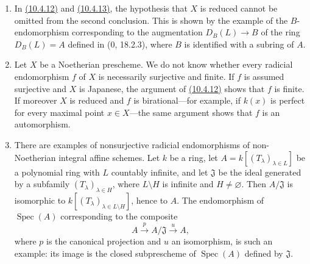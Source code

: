 \begin{remark}[10.4.14]
\label{IV.10.4.14}
\begin{enumerate}[label=\textup{(\roman*)}]
\item In {\hyperlink{ega4.c04.cor.10-4-12}{(10.4.12)}} and {\hyperlink{ega4.c04.cor.10-4-13}{(10.4.13)}}, the hypothesis that $X$ is reduced
cannot be omitted from the second conclusion.  This is shown by the
example of the $B$-endomorphism corresponding to the augmentation
$D_B(L)\to B$ of the ring $D_B(L)=A$ defined in (0, 18.2.3), where $B$
is identified with a subring of $A$.

\item Let $X$ be a Noetherian prescheme.  We do not know whether every
radicial endomorphism $f$ of $X$ is necessarily surjective and finite.
If $f$ is assumed surjective and $X$ is Japanese, the argument of
{\hyperlink{ega4.c04.cor.10-4-12}{(10.4.12)}} shows that $f$ is finite.  If moreover $X$ is reduced and
$f$ is birational---for example, if $k(x)$ is perfect for every maximal
point $x\in X$---the same argument shows that $f$ is an automorphism.

\item There are examples of nonsurjective radicial endomorphisms of
non-Noetherian integral affine schemes.  Let $k$ be a ring, let
$A=k[(T_\lambda)_{\lambda\in L}]$ be a polynomial ring with $L$
countably infinite, and let $\mathfrak J$ be the ideal generated by a
subfamily $(T_\lambda)_{\lambda\in H}$, where $L\setminus H$ is infinite
and $H\neq\varnothing$.  Then $A/\mathfrak J$ is isomorphic to
$k[(T_\lambda)_{\lambda\in L\setminus H}]$, hence to $A$.  The
endomorphism of $\operatorname{Spec}(A)$ corresponding to the composite
\[
 A\xrightarrow{p}A/\mathfrak J\xrightarrow{u}A,
\]
where $p$ is the canonical projection and $u$ an isomorphism, is such
an example: its image is the closed subprescheme of
$\operatorname{Spec}(A)$ defined by $\mathfrak J$.
\end{enumerate}
\end{remark}

\EGAIVErrataThirtyTwoThroughFiftyThree
